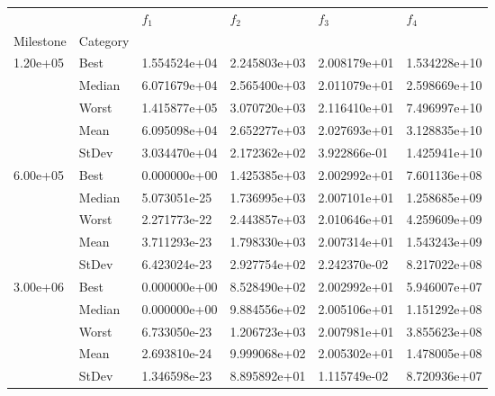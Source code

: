 \begin{tabular}{llllll}
\toprule
         &      &      $f_{1}$ &      $f_{2}$ &      $f_{3}$ &      $f_{4}$ \\
Milestone & Category &              &              &              &              \\
\midrule
\multirow{5}{*}{1.20e+05} & Best & 1.554524e+04 & 2.245803e+03 & 2.008179e+01 & 1.534228e+10 \\
         & Median & 6.071679e+04 & 2.565400e+03 & 2.011079e+01 & 2.598669e+10 \\
         & Worst & 1.415877e+05 & 3.070720e+03 & 2.116410e+01 & 7.496997e+10 \\
         & Mean & 6.095098e+04 & 2.652277e+03 & 2.027693e+01 & 3.128835e+10 \\
         & StDev & 3.034470e+04 & 2.172362e+02 & 3.922866e-01 & 1.425941e+10 \\
\cline{1-6}
\multirow{5}{*}{6.00e+05} & Best & 0.000000e+00 & 1.425385e+03 & 2.002992e+01 & 7.601136e+08 \\
         & Median & 5.073051e-25 & 1.736995e+03 & 2.007101e+01 & 1.258685e+09 \\
         & Worst & 2.271773e-22 & 2.443857e+03 & 2.010646e+01 & 4.259609e+09 \\
         & Mean & 3.711293e-23 & 1.798330e+03 & 2.007314e+01 & 1.543243e+09 \\
         & StDev & 6.423024e-23 & 2.927754e+02 & 2.242370e-02 & 8.217022e+08 \\
\cline{1-6}
\multirow{5}{*}{3.00e+06} & Best & 0.000000e+00 & 8.528490e+02 & 2.002992e+01 & 5.946007e+07 \\
         & Median & 0.000000e+00 & 9.884556e+02 & 2.005106e+01 & 1.151292e+08 \\
         & Worst & 6.733050e-23 & 1.206723e+03 & 2.007981e+01 & 3.855623e+08 \\
         & Mean & 2.693810e-24 & 9.999068e+02 & 2.005302e+01 & 1.478005e+08 \\
         & StDev & 1.346598e-23 & 8.895892e+01 & 1.115749e-02 & 8.720936e+07 \\
\bottomrule
\end{tabular}
